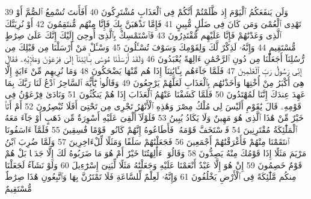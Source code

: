 {\tiny\colorbox{cl_aya}{39}} وَلَن يَنفَعَكُمُ ٱلْيَوْمَ إِذ ظَّلَمْتُمْ أَنَّكُمْ فِى ٱلْعَذَابِ مُشْتَرِكُونَ
{\tiny\colorbox{cl_aya}{40}} أَفَأَنتَ تُسْمِعُ ٱلصُّمَّ أَوْ تَهْدِى ٱلْعُمْىَ وَمَن كَانَ فِى ضَلَٰلٍ مُّبِينٍ
{\tiny\colorbox{cl_aya}{41}} فَإِمَّا نَذْهَبَنَّ بِكَ فَإِنَّا مِنْهُم مُّنتَقِمُونَ
{\tiny\colorbox{cl_aya}{42}} أَوْ نُرِيَنَّكَ ٱلَّذِى وَعَدْنَٰهُمْ فَإِنَّا عَلَيْهِم مُّقْتَدِرُونَ
{\tiny\colorbox{cl_aya}{43}} فَٱسْتَمْسِكْ بِٱلَّذِىٓ أُوحِىَ إِلَيْكَ إِنَّكَ عَلَىٰ صِرَٰطٍ مُّسْتَقِيمٍ
{\tiny\colorbox{cl_aya}{44}} وَإِنَّهُۥ لَذِكْرٌ لَّكَ وَلِقَوْمِكَ وَسَوْفَ تُسْـَٔلُونَ
{\tiny\colorbox{cl_aya}{45}} وَسْـَٔلْ مَنْ أَرْسَلْنَا مِن قَبْلِكَ مِن رُّسُلِنَآ أَجَعَلْنَا مِن دُونِ ٱلرَّحْمَٰنِ ءَالِهَةً يُعْبَدُونَ
{\tiny\colorbox{cl_aya}{46}} وَلَقَدْ أَرْسَلْنَا مُوسَىٰ بِـَٔايَٰتِنَآ إِلَىٰ فِرْعَوْنَ وَمَلَإِي۟هِۦ فَقَالَ إِنِّى رَسُولُ رَبِّ ٱلْعَٰلَمِينَ
{\tiny\colorbox{cl_aya}{47}} فَلَمَّا جَآءَهُم بِـَٔايَٰتِنَآ إِذَا هُم مِّنْهَا يَضْحَكُونَ
{\tiny\colorbox{cl_aya}{48}} وَمَا نُرِيهِم مِّنْ ءَايَةٍ إِلَّا هِىَ أَكْبَرُ مِنْ أُخْتِهَا وَأَخَذْنَٰهُم بِٱلْعَذَابِ لَعَلَّهُمْ يَرْجِعُونَ
{\tiny\colorbox{cl_aya}{49}} وَقَالُوا۟ يَٰٓأَيُّهَ ٱلسَّاحِرُ ٱدْعُ لَنَا رَبَّكَ بِمَا عَهِدَ عِندَكَ إِنَّنَا لَمُهْتَدُونَ
{\tiny\colorbox{cl_aya}{50}} فَلَمَّا كَشَفْنَا عَنْهُمُ ٱلْعَذَابَ إِذَا هُمْ يَنكُثُونَ
{\tiny\colorbox{cl_aya}{51}} وَنَادَىٰ فِرْعَوْنُ فِى قَوْمِهِۦ قَالَ يَٰقَوْمِ أَلَيْسَ لِى مُلْكُ مِصْرَ وَهَٰذِهِ ٱلْأَنْهَٰرُ تَجْرِى مِن تَحْتِىٓ أَفَلَا تُبْصِرُونَ
{\tiny\colorbox{cl_aya}{52}} أَمْ أَنَا۠ خَيْرٌ مِّنْ هَٰذَا ٱلَّذِى هُوَ مَهِينٌ وَلَا يَكَادُ يُبِينُ
{\tiny\colorbox{cl_aya}{53}} فَلَوْلَآ أُلْقِىَ عَلَيْهِ أَسْوِرَةٌ مِّن ذَهَبٍ أَوْ جَآءَ مَعَهُ ٱلْمَلَٰٓئِكَةُ مُقْتَرِنِينَ
{\tiny\colorbox{cl_aya}{54}} فَٱسْتَخَفَّ قَوْمَهُۥ فَأَطَاعُوهُ إِنَّهُمْ كَانُوا۟ قَوْمًا فَٰسِقِينَ
{\tiny\colorbox{cl_aya}{55}} فَلَمَّآ ءَاسَفُونَا ٱنتَقَمْنَا مِنْهُمْ فَأَغْرَقْنَٰهُمْ أَجْمَعِينَ
{\tiny\colorbox{cl_aya}{56}} فَجَعَلْنَٰهُمْ سَلَفًا وَمَثَلًا لِّلْءَاخِرِينَ
{\tiny\colorbox{cl_aya}{57}} وَلَمَّا ضُرِبَ ٱبْنُ مَرْيَمَ مَثَلًا إِذَا قَوْمُكَ مِنْهُ يَصِدُّونَ
{\tiny\colorbox{cl_aya}{58}} وَقَالُوٓا۟ ءَأَٰلِهَتُنَا خَيْرٌ أَمْ هُوَ مَا ضَرَبُوهُ لَكَ إِلَّا جَدَلًۢا بَلْ هُمْ قَوْمٌ خَصِمُونَ
{\tiny\colorbox{cl_aya}{59}} إِنْ هُوَ إِلَّا عَبْدٌ أَنْعَمْنَا عَلَيْهِ وَجَعَلْنَٰهُ مَثَلًا لِّبَنِىٓ إِسْرَٰٓءِيلَ
{\tiny\colorbox{cl_aya}{60}} وَلَوْ نَشَآءُ لَجَعَلْنَا مِنكُم مَّلَٰٓئِكَةً فِى ٱلْأَرْضِ يَخْلُفُونَ
{\tiny\colorbox{cl_aya}{61}} وَإِنَّهُۥ لَعِلْمٌ لِّلسَّاعَةِ فَلَا تَمْتَرُنَّ بِهَا وَٱتَّبِعُونِ هَٰذَا صِرَٰطٌ مُّسْتَقِيمٌ
